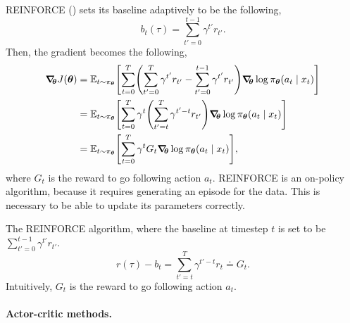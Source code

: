 REINFORCE () sets its baseline adaptively to be the
following, \[
  b_t(\tau) = \sum_{t'=0}^{t-1} \gamma^{t'} r_{t'}
.\]
Then, the gradient becomes the following, 
\begin{align*}
  \grad{J(\vec{\theta})}{\vec{\theta}} &= \E_{t\sim\pi_{\vec{\theta}}} \lft[ \sum_{t=0}^T \lft( \sum_{t'=0}^{T} \gamma^{t'} r_{t'} - \sum_{t'=0}^{t-1} \gamma^{t'} r_{t'} \rgt) \grad{\log \pi_{\vec{\theta}}(a_t\mid x_t)}{\vec{\theta}} \rgt] \\
  &= \E_{t\sim\pi_{\vec{\theta}}} \lft[ \sum_{t=0}^T \gamma^t \lft( \sum_{t'=t}^{T} \gamma^{t'-t} r_{t'} \rgt) \grad{\log \pi_{\vec{\theta}}(a_t\mid x_t)}{\vec{\theta}} \rgt] \\
  &= \E_{t\sim\pi_{\vec{\theta}}} \lft[ \sum_{t=0}^T \gamma^t G_t \grad{\log \pi_{\vec{\theta}}(a_t\mid x_t)}{\vec{\theta}} \rgt]
,\end{align*}
where $G_t$ is the reward to go following action $a_t$. REINFORCE is an
on-policy algorithm, because it requires generating an episode for the data.
This is necessary to be able to update its parameters correctly.

\begin{algorithm}[t]
  \begin{algorithmic}[1]
      \Repeat
        \EndFor
    \EndFunction
  \end{algorithmic}
  \caption{The REINFORCE algorithm, where the baseline at timestep $t$ is set to
  be $\sum_{t'=0}^{t-1} \gamma^{t'}r_{t'}$. \[ r(\tau) - b_t =
  \sum_{t'=t}^T \gamma^{t'-t} r_t \doteq G_t .\] Intuitively, $G_t$ is the reward to go
  following action $a_t$.}
  \label{alg:reinforce}
\end{algorithm}

\paragraph{Actor-critic methods.}



